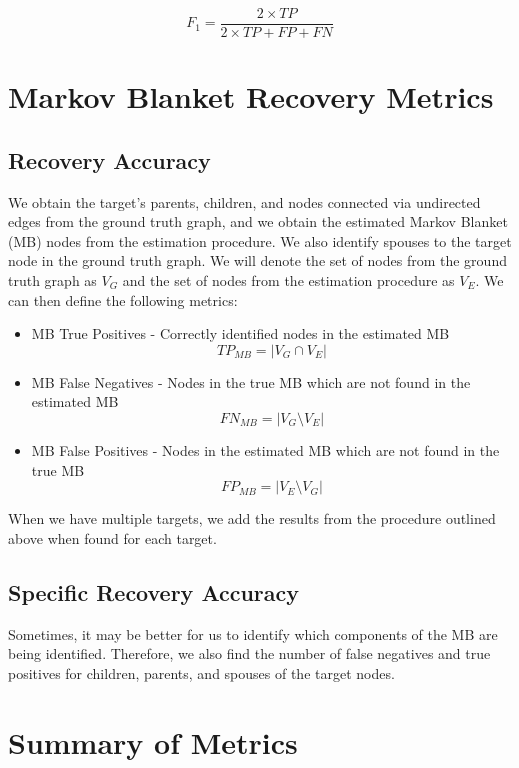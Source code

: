 \documentclass[12pt]{article}\usepackage[]{graphicx}\usepackage[]{color}
\begin{document}
$$ F_1 = \frac{2\times TP}{2\times TP + FP + FN} $$

\section*{Markov Blanket Recovery Metrics}

\subsection*{Recovery Accuracy}
We obtain the target's parents, children, and nodes connected via undirected edges from the ground truth graph, and we obtain the estimated Markov Blanket (MB) nodes from the estimation procedure. We also identify spouses to the target node in the ground truth graph. We will denote the set of nodes from the ground truth graph as $V_{G}$ and the set of nodes from the estimation procedure as $V_E$. We can then define the following metrics:
\begin{itemize}
\item MB True Positives - Correctly identified nodes in the estimated MB
$$ TP_{MB} = | V_G \cap V_E | $$
\item MB False Negatives - Nodes in the true MB which are not found in the estimated MB
$$ FN_{MB} = | V_G \setminus V_E | $$
\item MB False Positives - Nodes in the estimated MB which are not found in the true MB
$$ FP_{MB} = | V_E \setminus V_G | $$
\end{itemize}

When we have multiple targets, we add the results from the procedure outlined above when found for each target.

\subsection*{Specific Recovery Accuracy}
Sometimes, it may be better for us to identify which components of the MB are being identified. Therefore, we also find the number of false negatives and true positives for children, parents, and spouses of the target nodes.

\section*{Summary of Metrics}
\end{document}
